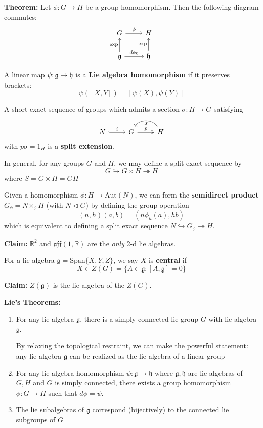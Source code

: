 \documentclass[12pt]{article}
\newcommand{\R}{\mathbb{R}}
\newcommand{\g}{\mathfrak{g}}
\newcommand{\h}{\mathfrak{h}}
\newcommand{\Aut}{\text{Aut}}
\begin{document}
\textbf{Theorem:} Let $\phi: G \to H$ be a group homomorphism. Then the following diagram commutes:
\[\begin{tikzcd}
    G \arrow{r}{\phi} & H\\ 
    \g \arrow{u}{\exp} \arrow{r}{d\phi_0} & \h \arrow{u}{\exp}
\end{tikzcd}\]

A linear map $\psi: \g \to \h$ is a \textbf{Lie algebra homomorphism} if it preserves brackets: 
\[\psi([X, Y]) = [\psi(X), \psi(Y)]\]

A short exact sequence of groups which admits a section $\sigma: H \to G$ satisfying 
\[\begin{tikzcd}
    N \arrow[hook]{r}{i} & G \arrow[two heads]{r}{p} & H \arrow[bend right=60]{l}{\sigma}{\sigma}
\end{tikzcd}\]
with $p\sigma = 1_H$ is a \textbf{split extension}. 

In general, for any groups $G$ and $H$, we may define a split exact sequence by 
\[G \hookrightarrow G \times H \twoheadrightarrow H\]
where $S = G \times H = GH$ 

Given a homomorphism $\phi: H \to \Aut(N)$, we can form the \textbf{semidirect product} $G_{\phi} = N \rtimes_\phi H$ (with $N \triangleleft G$) by defining the group operation
\[(n, h)(a, b) = (n\phi_h(a), hb)\]
which is equivalent to defining a split exact sequence $N \hookrightarrow G_{\phi} \twoheadrightarrow H$.

\textbf{Claim:} $\R^2$ and $\mathfrak{aff}(1, \R)$ are the \emph{only} 2-d lie algebras. 

For a lie algebra $\g = \text{Span}\{X, Y, Z\}$, we say $X$ is \textbf{central} if 
\[X \in Z(G) = \{A \in \g: [A, \g] = 0\}\]

\textbf{Claim:} $Z(\g)$ is the lie algebra of the $Z(G)$. 

\textbf{Lie's Theorems:} 
\begin{enumerate}
    \item For any lie algebra $\g$, there is a simply connected lie group $G$ with lie algebra $\g$. 
    
    By relaxing the topological restraint, we can make the powerful statement: any lie algebra $\g$ can be realized as the lie algebra of a linear group 

    \item For any lie algebra homomorphism $\psi: \g \to \h$ where $\g, \h$ are lie algebras of $G, H$ and $G$ is simply connected, there exists a group homomorphism $\phi: G \to H$ such that $d\phi = \psi$. 
    
    \item The lie subalgebras of $\g$ correspond (bijectively) to the connected lie subgroups of $G$ 
\end{enumerate}
\end{document}
